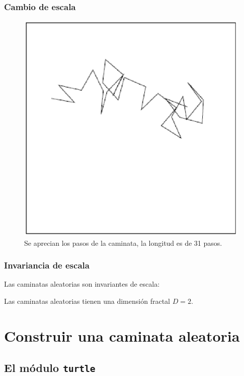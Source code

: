 \documentclass[12pt]{beamer}
\begin{document}
\begin{frame}
\frametitle{Cambio de escala}
\begin{figure}
	\centering
	\includegraphics[scale=0.5]{Imagenes/caminataAleatoria_06.eps}
	\caption{Se aprecian los pasos de la caminata, la longitud es de 31 pasos.}
\end{figure}
\end{frame}
\begin{frame}
\frametitle{Invariancia de escala}
Las caminatas aleatorias son invariantes de escala:
\\
\bigskip
\pause
\begin{center}
\end{center}
\pause
Las caminatas aleatorias tienen una dimensión fractal $D = 2$.
\end{frame}

\section{Construir una caminata aleatoria}
\subsection{El módulo \texttt{turtle}}
\end{document}
